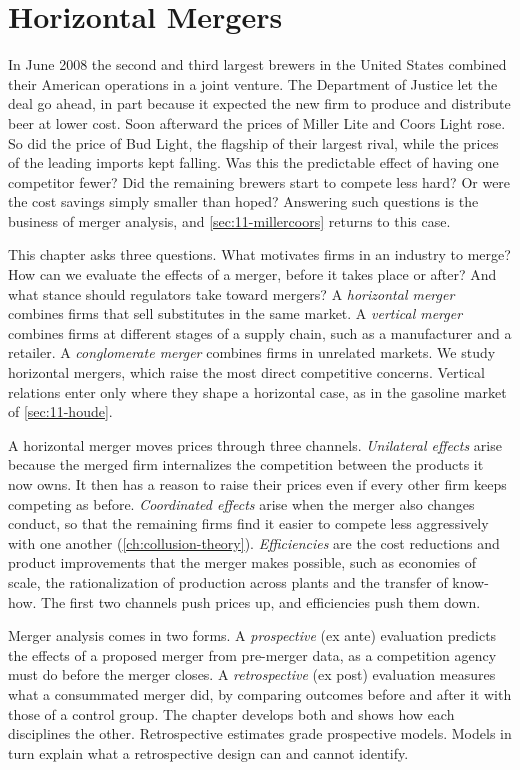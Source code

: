 \chapter{Horizontal Mergers}\label{ch:mergers}

In June 2008 the second and third largest brewers in the United States combined their American operations in a
joint venture. The Department of Justice let the deal go ahead, in part because it expected the new firm to produce
and distribute beer at lower cost. Soon afterward the prices of Miller Lite and Coors Light rose. So did the price of Bud Light, the
flagship of their largest rival, while the prices of the leading imports kept falling. Was this the predictable
effect of having one competitor fewer? Did the remaining brewers start to compete less hard? Or were the cost
savings simply smaller than hoped? Answering such questions is the business of merger analysis, and
\cref{sec:11-millercoors} returns to this case.

This chapter asks three questions. What motivates firms in an industry to merge? How can we evaluate the effects
of a merger, before it takes place or after? And what stance should regulators take toward mergers? A
\emph{horizontal merger} combines firms that sell substitutes in the same market. A \emph{vertical merger} combines
firms at different stages of a supply chain, such as a manufacturer and a retailer. A \emph{conglomerate merger}
combines firms in unrelated markets. We study horizontal mergers, which raise the most direct competitive concerns.
Vertical relations enter only where they shape a horizontal case, as in the gasoline market of \cref{sec:11-houde}.

A horizontal merger moves prices through three channels. \emph{Unilateral effects} arise because the merged firm
internalizes the competition between the products it now owns. It then has a reason to raise their prices even if
every other firm keeps competing as before. \emph{Coordinated effects} arise when the merger also changes conduct,
so that the remaining firms find it easier to compete less aggressively with one another
(\cref{ch:collusion-theory}). \emph{Efficiencies} are the cost reductions and product improvements that the merger
makes possible, such as economies of scale, the rationalization of production across plants and the transfer of
know-how. The first two channels push prices up, and efficiencies push them down.

Merger analysis comes in two forms. A \emph{prospective} (ex ante) evaluation predicts the effects of a proposed
merger from pre-merger data, as a competition agency must do before the merger closes. A \emph{retrospective} (ex
post) evaluation measures what a consummated merger did, by comparing outcomes before and after it with those of a
control group. The chapter develops both and shows how each disciplines the other. Retrospective estimates grade
prospective models. Models in turn explain what a retrospective design can and cannot identify.

